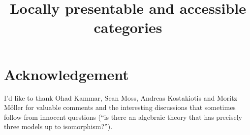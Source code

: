 \documentclass[11pt,a4paper]{article}
\title{Locally presentable and accessible categories}
\theoremstyle{margin}
\theoremstyle{nonumberplain}
\begin{document}
\maketitle

\pagebreak
\tableofcontents
\pagebreak


\parindent0cm


 \pagebreak
 \pagebreak

\section*{Acknowledgement}
I'd like to thank Ohad Kammar, Sean Moss, Andreas Kostakiotis and Moritz Möller for valuable comments and the interesting discussions that sometimes follow from innocent questions (``is there an algebraic theory that has precisely three models up to isomorphism?'').


\nocite{*}


\printbibliography[title=Bibliography]
\end{document}
